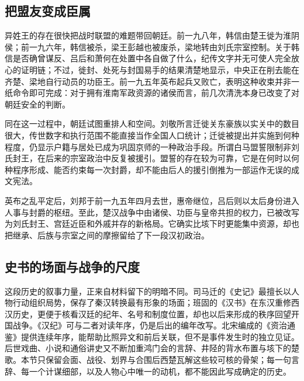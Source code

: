 \subsection{把盟友变成臣属}

异姓王的存在很快把战时联盟的难题带回朝廷。前一九八年，韩信由楚王徙为淮阴侯；前一九六年，韩信被杀，梁王彭越也被废杀，梁地转由刘氏宗室控制。关于韩信是否确曾谋反、吕后和萧何在处置中各自做了什么，纪传文字并无可使人完全放心的证明链；不过，徙封、处死与封国易手的结果清楚地显示，中央正在削去能在齐楚、梁地自行动员的功臣王。前一九五年英布起兵又败亡，表明这种收束并非一纸命令即可完成：对于拥有淮南军政资源的诸侯而言，前几次清洗本身已改变了对朝廷安全的判断。

同在这一过程中，朝廷试图重排人和空间。刘敬所言迁徙关东豪族以实关中的数目很大，传世数字和执行范围不能直接当作全国人口统计；迁徙被提出并实施到何种程度，仍显示户籍与居处已成为巩固京师的一种政治手段。所谓白马盟誓限制非刘氏封王，在后来的宗室政治中反复被援引。盟誓的存在较为可靠，它是在何时以何种程序形成、能否约束每一次封爵，却不能由后人的援引倒推为一部运作无误的成文宪法。

英布之乱平定后，刘邦于前一九五年四月去世，惠帝继位，吕后则以太后身份进入人事与封爵的枢纽。至此，楚汉战争中由诸侯、功臣与皇帝共担的权力，已被改写为刘氏封王、宫廷近臣和外戚并存的新格局。它确实比垓下时更能集中资源，却也把继承、后族与宗室之间的摩擦留给了下一段汉初政治。

\subsection{史书的场面与战争的尺度}

这段历史的叙事力量，正来自材料留下的明暗不同。司马迁的《史记》最擅长以人物行动组织局势，保存了秦汉转换最有形象的场面；班固的《汉书》在东汉重修西汉历史，更便于核看汉廷的纪年、名号和制度位置，却也以后来形成的秩序回望开国战争。《汉纪》可与二者对读年序，仍是后出的编年改写。北宋编成的《资治通鉴》提供连续年序，能帮助比照异文和前后关联，但不是事件发生时的独立见证。后世戏曲、小说和通俗讲史又不断加重鸿门会的言辞、井陉的背水布置与垓下的楚歌。本节只保留会面、战役、划界与合围后西楚瓦解这些较可核的骨架；每一句言辞、每一个计谋细部，以及人物心中唯一的动机，都不能因此写成确定的历史。
